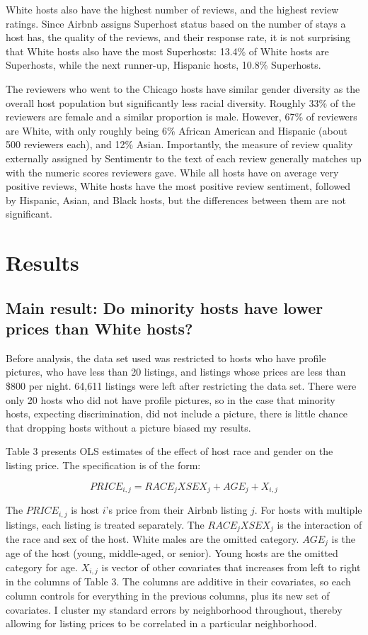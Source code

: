 \documentclass[11pt, oneside]{article}
\begin{document}
White hosts also have the highest number of reviews, and the highest review ratings. Since Airbnb assigns Superhost status based on the number of stays a host has, the quality of the reviews, and their response rate, it is not surprising that White hosts also have the most Superhosts: 13.4\% of White hosts are Superhosts, while the next runner-up, Hispanic hosts, 10.8\% Superhosts. 

The reviewers who went to the Chicago hosts have similar gender diversity as the overall host population but significantly less racial diversity. Roughly 33\% of the reviewers are female and a similar proportion is male. However, 67\% of reviewers are White, with only roughly being 6\% African American and Hispanic (about 500 reviewers each), and 12\% Asian. Importantly, the measure of review quality externally assigned by Sentimentr to the text of each review generally matches up with the numeric scores reviewers gave. While all hosts have on average very positive reviews, White hosts have the most positive review sentiment, followed by Hispanic, Asian, and Black hosts, but the differences between them are not significant. 


\section{Results}
\subsection{Main result: Do minority hosts have lower prices than White hosts?} %

Before analysis, the data set used was restricted to hosts who have profile pictures, who have less than 20 listings, and listings whose prices are less than \$800 per night. 64,611 listings were left after restricting the data set. There were only 20 hosts who did not have profile pictures, so in the case that minority hosts, expecting discrimination, did not include a picture, there is little chance that dropping hosts without a picture biased my results. 

Table 3 presents OLS estimates of the effect of host race and gender on the listing price. The specification is of the form: 

\[ PRICE_{i,j} = RACE_{j}XSEX_j + AGE_j + X_{i,j}\]

The $PRICE_{i,j}$ is host $i$'s price from their Airbnb listing $j$. For hosts with multiple listings, each listing is treated separately. The $RACE_{j}XSEX_j$ is the interaction of the race and sex of the host. White males are the omitted category. $AGE_j$ is the age of the host (young, middle-aged, or senior). Young hosts are the omitted category for age. $X_{i,j}$ is vector of other covariates that increases from left to right in the columns of Table 3. The columns are additive in their covariates, so each column controls for everything in the previous columns, plus its new set of covariates. I cluster my standard errors by neighborhood throughout, thereby allowing for listing prices to be correlated in a particular neighborhood.
\end{document}
